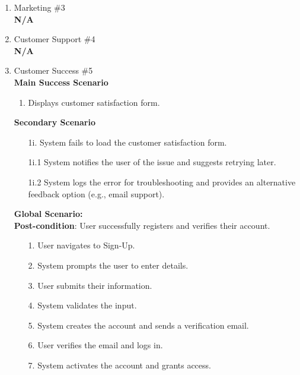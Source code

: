 \documentclass[]{article}
\begin{document}
\begin{enumerate}[{\bf BE1.}]
\begin{enumerate}[{\bf VP1.}]
 \item Marketing \#3 \\
	\textbf{N/A}

\item Customer Support \#4 \\
	\textbf{N/A}  

\item Customer Success \#5 \\
    \textbf{Main Success Scenario}
    \begin{enumerate}
		\item Displays customer satisfaction form.
    \end{enumerate}
    \textbf{Secondary Scenario}
   \begin{enumerate}
		\item[1i.] System fails to load the customer satisfaction form.
            \item[1i.1] System notifies the user of the issue and suggests retrying later.
            \item[1i.2] System logs the error for troubleshooting and provides an alternative feedback option (e.g., email support).
    \end{enumerate} 
	\textbf{Global Scenario:} \\
	\textbf{Post-condition}:  User successfully registers and verifies their account.

	\begin{enumerate}
		\item[1.] User navigates to Sign-Up.
		\item[2.] System prompts the user to enter details.
		\item[3.] User submits their information.
		\item[4.] System validates the input.
		\item[5.] System creates the account and sends a verification email.
		\item[6.] User verifies the email and logs in.
		\item[7.] System activates the account and grants access.
	\end{enumerate}


\end{enumerate}



\end{enumerate}
\end{document}
